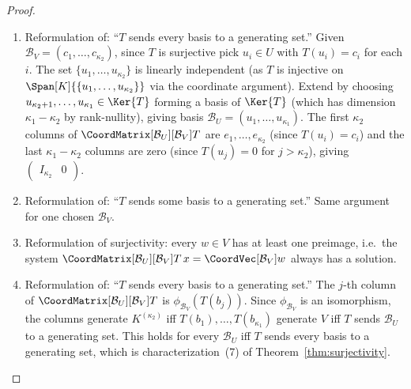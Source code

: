 \begin{proof}
    \leavevmode
    \begin{enumerate}
        \item Reformulation of: ``$T$ sends every basis to a generating set.'' Given
              $\mathcal{B}_V = (c_1, \ldots, c_{\kappa_2})$, since $T$ is surjective pick
              $u_i \in U$ with $T(u_i) = c_i$ for each $i$. The set
              $\{u_1, \ldots, u_{\kappa_2}\}$ is linearly independent (as $T$ is injective
              on $\Span[K]{\{u_1,\ldots,u_{\kappa_2}\}}$ via the coordinate argument).
              Extend by choosing $u_{\kappa_2+1}, \ldots, u_{\kappa_1} \in \Ker{T}$ forming
              a basis of $\Ker{T}$ (which has dimension $\kappa_1 - \kappa_2$ by
              rank-nullity), giving basis $\mathcal{B}_U = (u_1, \ldots, u_{\kappa_1})$.
              The first $\kappa_2$ columns of $\CoordMatrix[\mathcal{B}_U][\mathcal{B}_V]{T}$
              are $e_1, \ldots, e_{\kappa_2}$ (since $T(u_i) = c_i$) and the last
              $\kappa_1 - \kappa_2$ columns are zero (since $T(u_j) = 0$ for
              $j > \kappa_2$), giving $\begin{pmatrix} I_{\kappa_2} & 0 \end{pmatrix}$.

        \item Reformulation of: ``$T$ sends some basis to a generating set.'' Same argument
              for one chosen $\mathcal{B}_V$.

        \item Reformulation of surjectivity: every $w \in V$ has at least one preimage, i.e.\
              the system $\CoordMatrix[\mathcal{B}_U][\mathcal{B}_V]{T}\, x
              = \CoordVec[\mathcal{B}_V]{w}$ always has a solution.

        \item Reformulation of: ``$T$ sends every basis to a generating set.''
              The $j$-th column of $\CoordMatrix[\mathcal{B}_U][\mathcal{B}_V]{T}$
              is $\phi_{\mathcal{B}_V}(T(b_j))$.
              Since $\phi_{\mathcal{B}_V}$ is an isomorphism, the columns generate
              $K^{(\kappa_2)}$ iff $T(b_1), \ldots, T(b_{\kappa_1})$ generate $V$ iff $T$
              sends $\mathcal{B}_U$ to a generating set. This holds for every $\mathcal{B}_U$
              iff $T$ sends every basis to a generating set, which is
              characterization~(7) of Theorem~\ref{thm:surjectivity}. \qedhere
    \end{enumerate}
\end{proof}

